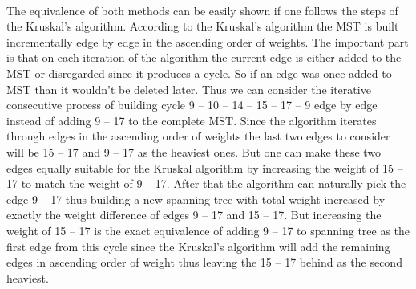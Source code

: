 \begin{enumerate}[(a)]
\paragraph{}
	The equivalence of both methods can be easily shown if one follows the steps of the Kruskal's algorithm. According to the Kruskal's algorithm the MST is built incrementally edge by edge in the ascending order of weights. The important part is that on each iteration of the algorithm the current edge is either added to the MST or disregarded since it produces a cycle. So if an edge was once added to MST than it wouldn't be deleted later. Thus we can consider the iterative consecutive process of building cycle 9 -- 10 -- 14 -- 15 -- 17 -- 9 edge by edge instead of adding 9 -- 17 to the complete MST. Since the algorithm iterates through edges in the ascending order of weights the last two edges to consider will be 15 -- 17 and 9 -- 17 as the heaviest ones. But one can make these two edges equally suitable for the Kruskal algorithm by increasing the weight of 15 -- 17 to match the weight of 9 -- 17. After that the algorithm can naturally pick the edge 9 -- 17 thus building a new spanning tree with total weight increased by exactly the weight difference of edges 9 -- 17 and 15 -- 17. But increasing the weight of 15 -- 17 is the exact equivalence of adding 9 -- 17 to spanning tree as the first edge from this cycle since the Kruskal's algorithm will add the remaining edges in ascending order of weight thus leaving the 15 -- 17 behind as the second heaviest.

\end{enumerate}